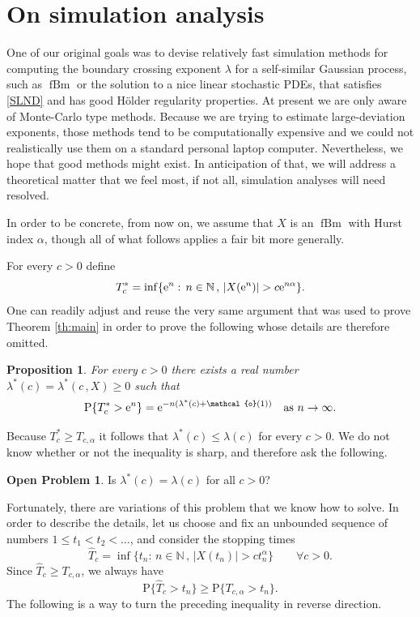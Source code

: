 \documentclass[reqno]{amsart}
\DeclareMathOperator{\fBm}{fBm}
\newcommand{\<}{\langle}
\renewcommand{\>}{\rangle}
\newcommand{\N}{\mathbb{N}}
\renewcommand{\P}{\mathrm{P}}
\newcommand{\1}{\mathbb{1}}
\newcommand{\e}{{\rm e}}
\renewcommand{\ge}{\geqslant}
\renewcommand{\le}{\leqslant}
\newtheorem{proposition}[stat]{Proposition}
\theoremstyle{definition}
\newtheorem{OP}[stat]{Open Problem}
\numberwithin{equation}{section}
\begin{document}
\section{On simulation analysis}

One of our original goals was to devise relatively fast simulation methods for computing
the boundary crossing exponent $\lambda$ for a self-similar Gaussian process,
such as $\fBm$ or the solution to a nice linear
stochastic PDEs, that satisfies \eqref{SLND} and has good
H\"older regularity properties. At present we are only aware of
Monte-Carlo type methods. Because we are trying to estimate large-deviation
exponents, those methods tend to be computationally expensive and we could
not realistically use them on a standard personal laptop computer.
Nevertheless, we hope that good methods might exist.
In anticipation of that, we will address a theoretical matter
that we feel most, if not all, simulation analyses will need resolved. 

In order to be concrete, from now on, we assume that $X$ is an $\fBm$ with Hurst index $\alpha$, though all of what follows applies a fair bit more generally.


For every $c>0$ define
\[
	T^*_c = \inf\{ \e^n : \, n\in\N\,,\, |X(\e^n)| > c\e^{n\alpha}\}.
\]
One can readily adjust and reuse the very
same argument that was used to
prove Theorem \ref{th:main} in order to prove the following
whose details are therefore omitted.

\begin{proposition}	
	For every $c>0$ there exists a real number $\lambda^*(c)=\lambda^*(c\,,X)\ge0$ such that
	\[
		\P\{ T^*_c> \e^n \} = \e^{-n(\lambda^*(c)+\mathcal{o}(1))}\quad\text{as $n\to\infty$}.
	\]
\end{proposition}

Because $T^*_c \ge T_{c,\alpha}$ it follows that
$\lambda^*(c) \le\lambda(c)$ for every $c>0$. 
We do not know whether or not the inequality is
sharp, and therefore ask the following.

\begin{OP}\label{OP2}
	Is $\lambda^*(c)=\lambda(c)$ for all $c>0$?
\end{OP}

Fortunately, there are variations of this problem that we know how to solve. 
In order to describe the details, let us choose and fix an unbounded sequence 
of numbers $1\le t_1<t_2<\ldots$, and consider
the stopping times
\[
	\hat{T}_c = \inf\{ t_n : \, n\in\N\,,\, |X(t_n)| > ct_n^\alpha\}
	\qquad\forall c>0.
\]
Since $\hat{T}_c \ge T_{c,\alpha}$, we always have
\begin{equation}\label{LB}
	\P\{ \hat{T}_c > t_n \} \ge \P\{ T_{c,\alpha} > t_n\}.
\end{equation}
The following is a way to turn the preceding inequality in reverse direction.
\end{document}

